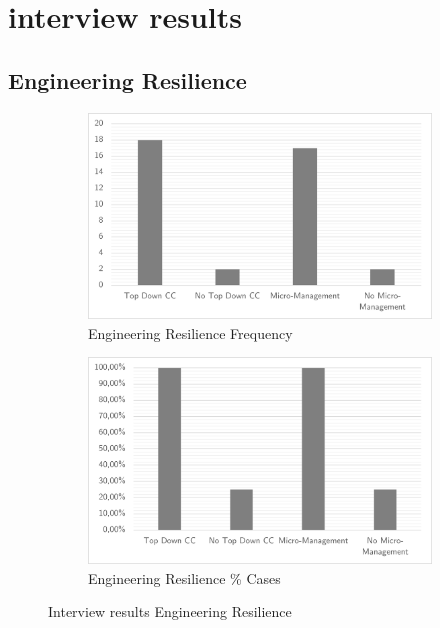 \section{interview results}
\subsection{Engineering Resilience}
\begin{figure}[H]
	\centering
	\begin{subfigure}[H]{0.5\textwidth}
		\centering
		\includegraphics[width=0.95\linewidth]{images/engineeringresilience_frequency}
		\caption{Engineering Resilience Frequency}
		\label{fig:engineeringresiliencefrequency}
	\end{subfigure}%
	\begin{subfigure}[H]{0.5\textwidth}
		\centering
		\includegraphics[width=0.95\linewidth]{images/engineeringresilience_cases}
		\caption{Engineering Resilience \% Cases}
		\label{fig:engineeringresiliencecases}
	\end{subfigure}
	\caption{Interview results Engineering Resilience}
	\label{fig:interviewresultsengineeringresilience}
\end{figure}


